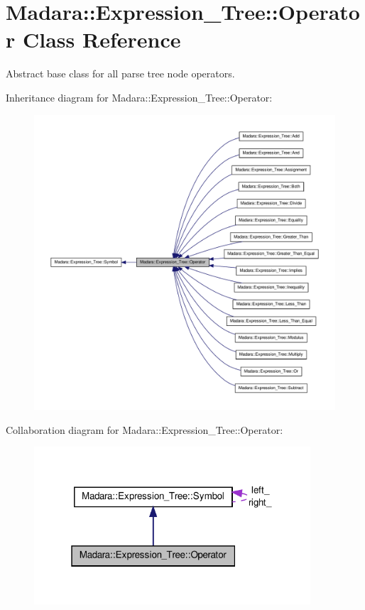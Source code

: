 \hypertarget{classMadara_1_1Expression__Tree_1_1Operator}{
\section{Madara::Expression\_\-Tree::Operator Class Reference}
\label{d2/d21/classMadara_1_1Expression__Tree_1_1Operator}
}


Abstract base class for all parse tree node operators.  




Inheritance diagram for Madara::Expression\_\-Tree::Operator:
\nopagebreak
\begin{figure}[H]
\begin{center}
\leavevmode
\includegraphics[width=400pt]{da/d96/classMadara_1_1Expression__Tree_1_1Operator__inherit__graph}
\end{center}
\end{figure}


Collaboration diagram for Madara::Expression\_\-Tree::Operator:
\nopagebreak
\begin{figure}[H]
\begin{center}
\leavevmode
\includegraphics[width=292pt]{df/dd3/classMadara_1_1Expression__Tree_1_1Operator__coll__graph}
\end{center}
\end{figure}
